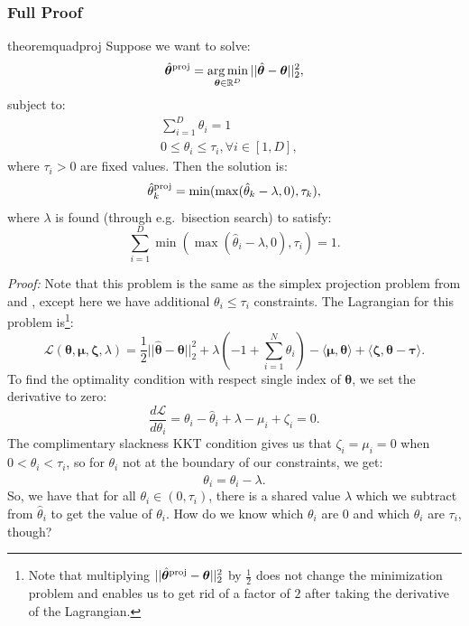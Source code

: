 \documentclass{article} %
\newcommand{\bmthproj}{\hat{\bm{\theta}}^{\textnormal{proj}}}
\newcommand{\thproj}{\hat{\theta}^{\textnormal{proj}}}
\begin{document}
\subsubsection{Full Proof}
\label{quad_full}

\begin{restatable}{theorem}{quadproj}
Suppose we want to solve:
\[
\bmthproj = \argmin_{\bm{\theta}\in\mathbb{R}^D} ||\hat{\bm{\theta}}-\bm{\theta}||_2^2,
\]
subject to:
\begin{align*}
\sum_{i=1}^D \theta_i = 1&\\
0 \leq \theta_i \leq \tau_i, \forall i \in [1,D],
\end{align*}
where $\tau_i>0$ are fixed values.
Then the solution is:
\[
\thproj_k = \min(\max(\hat{\theta}_k - \lambda, 0), \tau_k),
\]
where $\lambda$ is found (through e.g.\ bisection search) to satisfy:
\[
\sum_{i=1}^D \min(\max(\hat{\theta}_i - \lambda, 0), \tau_i) = 1.
\]
\end{restatable}

\textit{Proof:} Note that this problem is the same as the simplex projection problem from \citet{shalev2006efficient} and \citet{duchi2008efficient}, except here we have additional $\theta_i \leq \tau_i$ constraints. The Lagrangian for this problem is\footnote{Note that multiplying $||\bmthproj-\bm{\theta}||_2^2$ by $\frac{1}{2}$ does not change the minimization problem and enables us to get rid of a factor of $2$ after taking the derivative of the Lagrangian.}:
\[
\mathcal{L}(\bm{\theta}, \mathbf{\mu}, \mathbf{\zeta}, \lambda) = \frac{1}{2}||\hat{\bm{\theta}}-\bm{\theta}||_2^2 + \lambda \left(-1 + \sum_{i=1}^N \theta_i \right) - \langle\mathbf{\mu}, \bm{\theta}\rangle + \langle\mathbf{\zeta}, \bm{\theta}-\mathbf{\tau}\rangle.
\]
To find the optimality condition with respect single index of $\bm{\theta}$, we set the derivative to zero:
\[
\frac{d\mathcal{L}}{d\theta_i} = \theta_i - \hat{\theta}_i + \lambda - \mu_i + \zeta_i = 0.
\]
The complimentary slackness KKT condition gives us that $\zeta_i=\mu_i=0$ when $0 < \theta_i < \tau_i$, so for $\theta_i$ not at the boundary of our constraints, we get:
\[
\theta_i = \hat{\theta}_i - \lambda.
\]
So, we have that for all $\theta_i \in (0, \tau_i)$, there is a shared value $\lambda$ which we subtract from $\hat{\theta}_i$ to get the value of $\theta_i$. How do we know which $\theta_i$ are $0$ and which $\theta_i$ are $\tau_i$, though?
\end{document}
